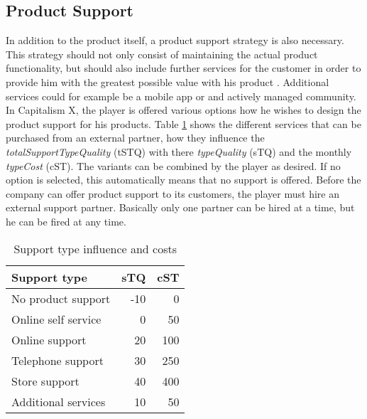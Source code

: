\subsection{Product Support}  \label{product_support_simulation}

In addition to the product itself, a product support strategy is also necessary. This strategy should not only consist of maintaining the actual product functionality, but should also include further services for the customer in order to provide him with the greatest possible value with his product \cite{markeset_design_2003}. Additional services could for example be a mobile app or and actively managed community.  
In Capitalism X, the player is offered various options how he wishes to design the product support for his products. Table \ref{Support_types} shows the different services that can be purchased from an external partner, how they influence the \textit{totalSupportTypeQuality} (\gls{tSTQ}) with there \textit{typeQuality} (\gls{sTQ}) and the monthly \textit{typeCost} (\gls{cST}). The variants can be combined by the player as desired. If no option is selected, this automatically means that no support is offered.
Before the company can offer product support to its customers, the player must hire an external support partner. Basically only one partner can be hired at a time, but he can be fired at any time.

\begin{table}[ht]
    \centering
    \begin{tabular}{|l|r|r|}
    \hline
    \textbf{Support type} & \textbf{sTQ} & \textbf{cST} \\
    \hline
    No product support   & -10   & 0    \\
    Online self service  & 0     & 50   \\
    Online support       & 20    & 100  \\
    Telephone support    & 30    & 250  \\
    Store support        & 40    & 400  \\
    Additional services  & 10    & 50   \\     
    \hline
    \end{tabular}
    \caption{Support type influence and costs}
    \label{Support_types}
\end{table}

